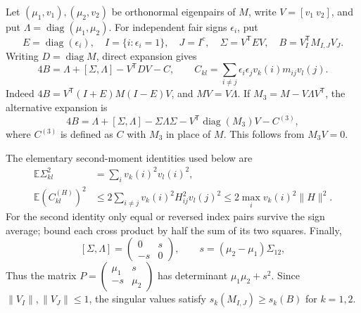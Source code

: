 Let $(\mu_1,v_1),(\mu_2,v_2)$ be orthonormal eigenpairs of $M$,
write $V=[v_1\ v_2]$, and put $\Lambda=\operatorname{diag}(\mu_1,\mu_2)$.
For independent fair signs $\epsilon_i$, put
\[
 E=\operatorname{diag}(\epsilon_i),\quad
 I=\{i:\epsilon_i=1\},\quad J=I^c,\quad
 \Sigma=V^{\mathsf T}EV,\quad B=V_I^{\mathsf T}M_{I,J}V_J.
\]
Writing $D=\operatorname{diag}M$, direct expansion gives
\begin{equation}\label{lower:partition-expansion}
 4B=\Lambda+[\Sigma,\Lambda]-V^{\mathsf T}DV-C,
 \qquad C_{kl}=\sum_{i\ne j}\epsilon_i\epsilon_j
                         v_k(i)m_{ij}v_l(j).
\end{equation}
Indeed $4B=V^{\mathsf T}(I+E)M(I-E)V$, and $MV=V\Lambda$.
If $M_3=M-V\Lambda V^{\mathsf T}$, the alternative expansion is
\begin{equation}\label{lower:remainder-expansion}
 4B=\Lambda+[\Sigma,\Lambda]-\Sigma\Lambda\Sigma
       -V^{\mathsf T}\operatorname{diag}(M_3)V-C^{(3)},
\end{equation}
where $C^{(3)}$ is defined as $C$ with $M_3$ in place of $M$.
This follows from $M_3V=0$.

The elementary second-moment identities used below are
\begin{align}
 \mathbb E\Sigma_{kl}^2
 &=\sum_i v_k(i)^2v_l(i)^2,\label{lower:sigma-variance}\\
 \mathbb E(C^{(H)}_{kl})^2
 &\leq2\sum_{i\ne j}v_k(i)^2H_{ij}^2v_l(j)^2
 \leq2\max_i v_k(i)^2\|H\|^2.
 \label{lower:chaos-variance}
\end{align}
For the second identity only equal or reversed index pairs survive
the sign average; bound each cross product by half the sum of its
two squares.  Finally,
\[
 [\Sigma,\Lambda]=\begin{pmatrix}0&s\\-s&0\end{pmatrix},
 \qquad s=(\mu_2-\mu_1)\Sigma_{12},
\]
Thus the matrix
$P=\left(\begin{smallmatrix}\mu_1&s\\-s&\mu_2\end{smallmatrix}\right)$
has determinant $\mu_1\mu_2+s^2$.  Since $\|V_I\|,\|V_J\|\leq1$,
the singular values satisfy $s_k(M_{I,J})\geq s_k(B)$ for $k=1,2$.


